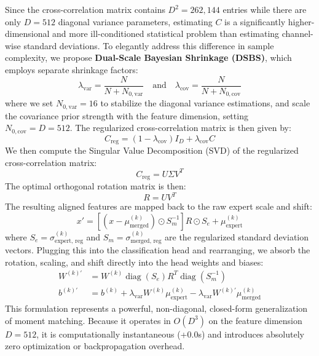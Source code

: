 \documentclass{article}
\theoremstyle{plain}
\theoremstyle{definition}
\theoremstyle{remark}
\begin{document}
Since the cross-correlation matrix contains $D^2 = 262,144$ entries while there are only $D = 512$ diagonal variance parameters, estimating $C$ is a significantly higher-dimensional and more ill-conditioned statistical problem than estimating channel-wise standard deviations. To elegantly address this difference in sample complexity, we propose \textbf{Dual-Scale Bayesian Shrinkage (DSBS)}, which employs separate shrinkage factors:
\begin{equation}
\lambda_{\text{var}} = \frac{N}{N + N_{0, \text{var}}} \quad \text{and} \quad \lambda_{\text{cov}} = \frac{N}{N + N_{0, \text{cov}}}
\end{equation}
where we set $N_{0, \text{var}} = 16$ to stabilize the diagonal variance estimations, and scale the covariance prior strength with the feature dimension, setting $N_{0, \text{cov}} = D = 512$. The regularized cross-correlation matrix is then given by:
\begin{equation}
C_{\text{reg}} = (1 - \lambda_{\text{cov}}) I_D + \lambda_{\text{cov}} C
\end{equation}
We then compute the Singular Value Decomposition (SVD) of the regularized cross-correlation matrix:
\begin{equation}
C_{\text{reg}} = U \Sigma V^T
\end{equation}
The optimal orthogonal rotation matrix is then:
\begin{equation}
R = U V^T
\end{equation}
The resulting aligned features are mapped back to the raw expert scale and shift:
\begin{equation}
x' = \left[ (x - \mu_{\text{merged}}^{(k)}) \odot S_m^{-1} \right] R \odot S_e + \mu_{\text{expert}}^{(k)}
\end{equation}
where $S_e = \sigma_{\text{expert, reg}}^{(k)}$ and $S_m = \sigma_{\text{merged, reg}}^{(k)}$ are the regularized standard deviation vectors. Plugging this into the classification head and rearranging, we absorb the rotation, scaling, and shift directly into the head weights and biases:
\begin{align}
W^{(k)\prime} &= W^{(k)} \operatorname{diag}(S_e) R^T \operatorname{diag}\left(S_m^{-1}\right) \\
b^{(k)\prime} &= b^{(k)} + \lambda_{\text{var}} W^{(k)} \mu_{\text{expert}}^{(k)} - \lambda_{\text{var}} W^{(k)\prime} \mu_{\text{merged}}^{(k)}
\end{align}
This formulation represents a powerful, non-diagonal, closed-form generalization of moment matching. Because it operates in $O(D^3)$ on the feature dimension $D = 512$, it is computationally instantaneous (+0.0s) and introduces absolutely zero optimization or backpropagation overhead.
\end{document}
